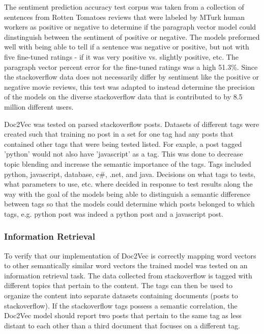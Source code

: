 The sentiment prediction accuracy test corpus was taken from a collection of sentences from Rotten Tomatoes reviews that were labeled by MTurk human workers as positive or negative to determine if the paragraph vector model could dinstinguish between the sentiment of positive or negative. The models preformed well with being able to tell if a sentence was negative or positive, but not with five fine-tuned ratings - if it was very positive vs. slightly positive, etc. The paragraph vector percent error for the fine-tuned ratings was a high 51.3\%. Since the stackoverflow data does not necessarily differ by sentiment like the positive or negative movie reviews, this test was adapted to instead determine the precision of the models on the diverse stackoverflow data that is contributed to by 8.5 million different users. \cite{RefWorks:doc:5aa6a3c0e4b0db66bcfd06c7}

Doc2Vec was tested on parsed stackoverflow posts. Datasets of different tags were created such that training no post in a set for one tag had any posts that contained other tags that were being tested listed. For exaple, a post tagged 'python' would not also have 'javascript' as a tag. This was done to decrease topic blending and increase the semantic importance of the tags. Tags included python, javascript, database, c\#, .net, and java. Decisions on what tags to tests, what parameters to use, etc. where decided in response to test results along the way with the goal of the models being able to distinguish a semantic difference between tags so that the models could determine which posts belonged to which tags, e.g. python post was indeed a python post and a javascript post.

\subsubsection{Information Retrieval} To verify that our implementation of Doc2Vec is correctly mapping word vectors to other semantically similar word vectors the trained model was tested on an information retrieval task. The data collected from stackoverflow is tagged with different topics that pertain to the content. The tags can then be used to organize the content into separate datasets containing documents (posts to stackoverflow). If the stackoverflow tags possess a semantic correlation, the Doc2Vec model should report two posts that pertain to the same tag as less distant to each other than a third document that focuses on a different tag.

